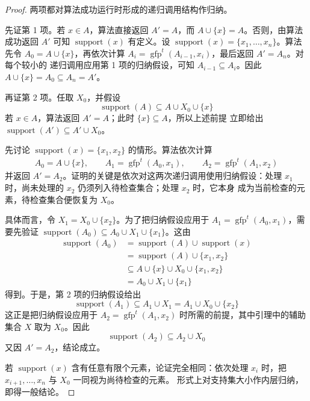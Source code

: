 
\begin{proof}
两项都对算法成功运行时形成的递归调用结构作归纳。

先证第 1 项。若 \(x\in A\)，算法直接返回 \(A'=A\)，而
\(A\cup\{x\}=A\)。否则，由算法成功返回 \(A'\) 可知
\(\operatorname{support}(x)\) 有定义。设
\(\operatorname{support}(x)=\{x_1,\ldots,x_n\}\)。算法先令
\(A_0=A\cup\{x\}\)，再依次计算
\(A_i=\operatorname{gfp}^t(A_{i-1},x_i)\)，最后返回 \(A'=A_n\)。对每个较小的
递归调用应用第 1 项的归纳假设，可知 \(A_{i-1}\subseteq A_i\)。因此
\(A\cup\{x\}=A_0\subseteq A_n=A'\)。

再证第 2 项。任取 \(X_0\)，并假设
\[
\operatorname{support}(A)\subseteq A\cup X_0\cup\{x\}
\]
若 \(x\in A\)，算法返回 \(A'=A\)；此时 \(\{x\}\subseteq A\)，所以上述前提
立即给出 \(\operatorname{support}(A')\subseteq A'\cup X_0\)。

先讨论 \(\operatorname{support}(x)=\{x_1,x_2\}\) 的情形。算法依次计算
\[
\begin{gathered}
A_0=A\cup\{x\},\qquad
A_1=\operatorname{gfp}^t(A_0,x_1),\qquad
A_2=\operatorname{gfp}^t(A_1,x_2)
\end{gathered}
\]
并返回 \(A'=A_2\)。证明的关键是依次对这两次递归调用使用归纳假设：处理
\(x_1\) 时，尚未处理的 \(x_2\) 仍须列入待检查集合；处理 \(x_2\) 时，它本身
成为当前检查的元素，待检查集合便恢复为 \(X_0\)。

具体而言，令 \(X_1=X_0\cup\{x_2\}\)。为了把归纳假设应用于
\(A_1=\operatorname{gfp}^t(A_0,x_1)\)，需要先验证
\(\operatorname{support}(A_0)\subseteq A_0\cup X_1\cup\{x_1\}\)。这由
\[
\begin{aligned}
\operatorname{support}(A_0)
&=\operatorname{support}(A)\cup\operatorname{support}(x)\\
&=\operatorname{support}(A)\cup\{x_1,x_2\}\\
&\subseteq A\cup\{x\}\cup X_0\cup\{x_1,x_2\}\\
&=A_0\cup X_1\cup\{x_1\}
\end{aligned}
\]
得到。于是，第 2 项的归纳假设给出
\[
\operatorname{support}(A_1)
\subseteq A_1\cup X_1
=A_1\cup X_0\cup\{x_2\}
\]
这正是把归纳假设应用于
\(A_2=\operatorname{gfp}^t(A_1,x_2)\) 时所需的前提，其中引理中的辅助集合
\(X\) 取为 \(X_0\)。因此
\[
\operatorname{support}(A_2)\subseteq A_2\cup X_0
\]
又因 \(A'=A_2\)，结论成立。

若 \(\operatorname{support}(x)\) 含有任意有限个元素，论证完全相同：依次处理
\(x_i\) 时，把 \(x_{i+1},\ldots,x_n\) 与 \(X_0\) 一同视为尚待检查的元素。
形式上对支持集大小作内层归纳，即得一般结论。
\end{proof}

